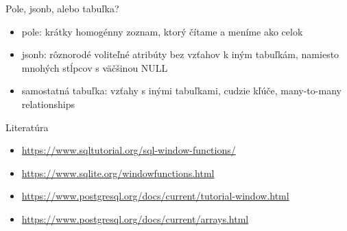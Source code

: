 \documentclass[12pt]{beamer}
\begin{document}
\begin{frame}[fragile]{Pole, jsonb, alebo tabuľka?}
\begin{itemize}
\item pole: krátky homogénny zoznam, ktorý čítame a meníme ako celok
\item jsonb: rôznorodé voliteľné atribúty bez vzťahov k iným tabuľkám, namiesto mnohých stĺpcov s väčšinou NULL
\item samostatná tabuľka: vzťahy s inými tabuľkami, cudzie kľúče, many-to-many relationships
\end{itemize}
\end{frame}

\begin{frame}{Literatúra}
\begin{itemize}
\item {\scriptsize\url{https://www.sqltutorial.org/sql-window-functions/}}
\item {\scriptsize\url{https://www.sqlite.org/windowfunctions.html}}
\item {\scriptsize\url{https://www.postgresql.org/docs/current/tutorial-window.html}}
\item {\scriptsize\url{https://www.postgresql.org/docs/current/arrays.html}}
\end{itemize}
\end{frame}
\end{document}
